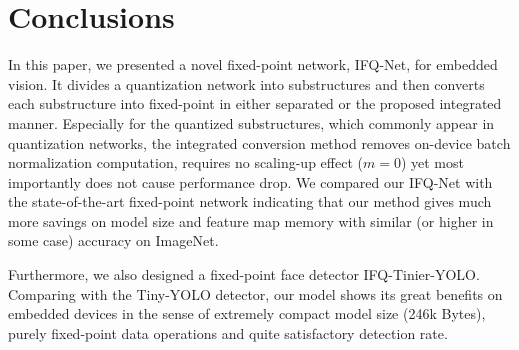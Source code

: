 \documentclass[10pt,twocolumn,letterpaper]{article}
\begin{document}
\section{Conclusions}
In this paper, we presented a novel fixed-point network, IFQ-Net, for embedded vision. It divides a quantization network into substructures and then converts each substructure into fixed-point in either separated or the proposed integrated manner. Especially for the quantized substructures,  which commonly appear in quantization networks, the integrated conversion method removes on-device batch normalization computation, requires no scaling-up effect ($m=0$) yet most importantly does not cause performance drop. We compared our IFQ-Net with the state-of-the-art fixed-point network indicating that our method gives much more savings on model size and feature map memory with similar (or higher in some case) accuracy on ImageNet.

Furthermore, we also designed a fixed-point face detector IFQ-Tinier-YOLO. Comparing with the Tiny-YOLO detector, our model shows its great benefits on embedded devices in the sense of extremely compact model size (246k Bytes), purely fixed-point data operations and quite satisfactory detection rate.

{\small


}
\end{document}

